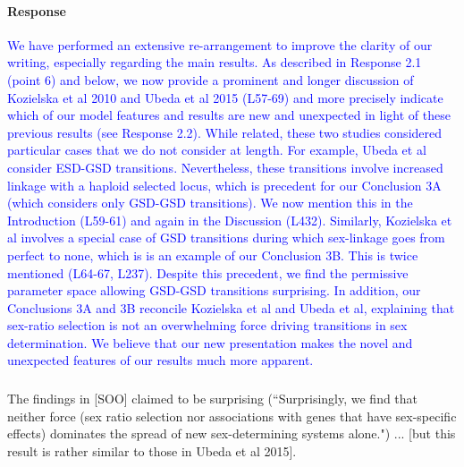 \documentclass[10pt,letterpaper]{article}
\begin{document}
\noindent\paragraph{Response}
\textcolor{blue}{
We have performed an extensive re-arrangement to improve the clarity of our writing, especially regarding the main results. 
As described in Response 2.1 (point 6) and below, we now provide a prominent and longer discussion of Kozielska et al 2010 and Ubeda et al 2015 (L57-69) and more precisely indicate which of our model features and results are new and unexpected in light of these previous results (see Response 2.2).
While related, these two studies considered particular cases that we do not consider at length. 
For example, Ubeda et al consider ESD-GSD transitions. 
Nevertheless, these transitions involve increased linkage with a haploid selected locus, which is precedent for our Conclusion 3A (which considers only GSD-GSD transitions).
We now mention this in the Introduction (L59-61) and again in the Discussion (L432).  
Similarly, Kozielska et al involves a special case of GSD transitions during which sex-linkage goes from perfect to none, which is is an  example of our Conclusion 3B.
This is twice mentioned (L64-67, L237). 
Despite this precedent, we find the permissive parameter space allowing GSD-GSD transitions surprising. 
In addition, our Conclusions 3A and 3B reconcile Kozielska et al and Ubeda et al, explaining that sex-ratio selection is not an overwhelming force driving transitions in sex determination. 
We believe that our new presentation makes the novel and unexpected features of our results much more apparent. 
}

\noindent\subsubsection{}
The findings in [SOO] claimed to be surprising (``Surprisingly, we find that neither force (sex ratio selection nor associations with genes that have sex-specific effects) dominates the spread of new sex-determining systems alone.") ... [but this result is rather similar to those in Ubeda et al 2015]. 
\end{document}

